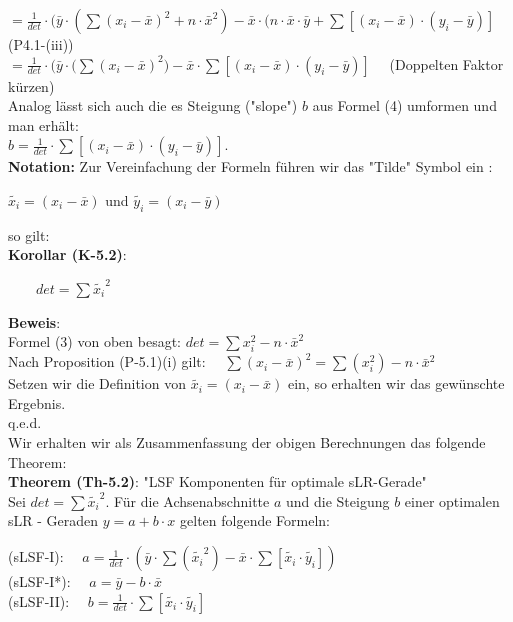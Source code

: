 \documentclass[12pt]{article}
\begin{document}
$ = \frac{1}{det} \cdot (\bar{y} \cdot (\sum{(x_i - \bar{x})^2} + n \cdot \bar{x}^2) - \bar{x} \cdot (n \cdot \bar{x} \cdot \bar{y} + \sum{[(x_i - \bar{x}) \cdot (y_i - \bar{y})]} $      (P4.1-(iii)) \\[0.2cm]
$ = \frac{1}{det} \cdot (\bar{y} \cdot (\sum{(x_i - \bar{x})^2)} - \bar{x} \cdot \sum{[(x_i - \bar{x}) \cdot (y_i - \bar{y})]} \quad $                                   (Doppelten Faktor kürzen)
\\[0.2cm]
Analog lässt sich auch die es Steigung ("slope") $b$ aus Formel (4) umformen und man erhält: \\[0.2cm]
$ b = \frac{1}{det} \cdot \sum{[(x_i - \bar{x}) \cdot (y_i - \bar{y})]}$.
\\[0.5cm]
%
\textbf{Notation:} Zur Vereinfachung der Formeln führen wir das "Tilde" Symbol ein : \\
\begin{center} 
 $ \widetilde{x_i} = (x_i - \bar{x}) $ und $ \widetilde{y_i} = (x_i - \bar{y}) $ \end{center}
%
so gilt:\\[0.2cm]
\textbf{Korollar (K-5.2)}: 
\begin{center}
\begin{large}
 $ \qquad det = \sum{\widetilde{x_i}}^2 \qquad \qquad $ \\[0.2cm] 
\end{large}
\end{center}
%
\textbf{Beweis}:\\
Formel (3) von oben besagt: $ det = \sum{x_i^2} - n \cdot \bar{x}^2 $\\
Nach Proposition (P-5.1)(i) gilt: $ \quad \sum(x_i - \bar{x})^2 = \sum(x_i^2) - n \cdot \bar{x}^2 $\\[0.2cm] 
Setzen wir die Definition von $ \widetilde{x_i} = (x_i - \bar{x}) $ ein, so erhalten wir das gewünschte Ergebnis.\\
q.e.d.\\[0.5cm]
%
Wir erhalten wir als Zusammenfassung der obigen Berechnungen das folgende Theorem: \\[0.6cm]
%
\textbf{Theorem (Th-5.2)}: "LSF Komponenten für optimale sLR-Gerade" \\[0.2cm]
Sei $ det = \sum{\widetilde{x_i}}^2 $. Für die Achsenabschnitte $a$ und die Steigung $b$ einer optimalen sLR - Geraden $ y = a +  b \cdot x $ gelten folgende Formeln:\\[0.5cm]
\begin{large}
(sLSF-I): $ \quad a = \frac{1}{det} \cdot (\bar{y} \cdot \sum{(\widetilde{x_i}^2)} - \bar{x} \cdot  \sum{[\widetilde{x_i} \cdot \widetilde{y_i}]}) \quad\quad $   \\[0.3cm] 
(sLSF-I*): $ \quad a = \bar{y} - b \cdot \bar{x} \qquad \qquad \qquad \qquad\qquad \qquad $ \\[0.3cm]                                   
(sLSF-II): $ \quad b = \frac{1}{det} \cdot {\sum[\widetilde{x_i} \cdot \widetilde{y_i}]} \qquad \qquad \qquad \qquad $  \\[0.5cm]
\end{large}
\end{document}
